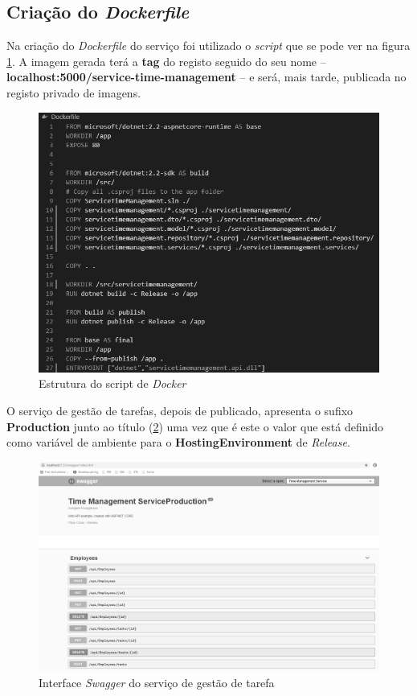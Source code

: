 \subsection{Criação do \textit{Dockerfile}}

\hspace{1cm}Na criação do \textit{Dockerfile} do serviço foi utilizado o \textit{script} que se pode ver na figura \ref{Fig:Fig91}. A imagem gerada terá a \textbf{tag} do registo seguido do seu nome -- \textbf{localhost:5000/service-time-management} -- e será, mais tarde, publicada no registo privado de imagens.

\begin{figure}[hbt!]
\centering
\includegraphics[width=0.95\linewidth]{Cap7/TimeManagementDockerfile.png}
\caption{Estrutura do script de \textit{Docker}}
\label{Fig:Fig91}
\end{figure}

O serviço de gestão de tarefas, depois de publicado, apresenta o sufixo \textbf{Production} junto ao título (\ref{Fig:Fig92}) uma vez que é este o valor que está definido como variável de ambiente para o \textbf{HostingEnvironment} de \textit{Release}. 

\begin{figure}[hbt!]
\centering
\includegraphics[width=0.9\linewidth]{Cap7/TimeManagementProduction.png}
\caption{Interface \textit{Swagger} do serviço de gestão de tarefa}
\label{Fig:Fig92}
\end{figure}

